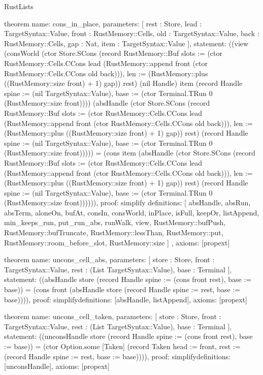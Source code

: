 \begin{lexlean}{RustLists}
\begin{semanticmodule}
theorem{
  name: cons_in_place,
  parameters: [
    rest : Store,
    lead : TargetSyntax::Value,
    front : RustMemory::Cells,
    old : TargetSyntax::Value,
    back : RustMemory::Cells,
    gap : Nat,
    item : TargetSyntax::Value
  ],
  statement: ((view (consWorld (ctor Store.SCons (record RustMemory::Buf {slots := (ctor RustMemory::Cells.CCons lead (RustMemory::append front (ctor RustMemory::Cells.CCons old back))), len := (RustMemory::plus ((RustMemory::size front) + 1) gap)}) rest) (nil Handle) item (record Handle {spine := (nil TargetSyntax::Value), base := (ctor Terminal.TRun 0 (RustMemory::size front))})) (absHandle (ctor Store.SCons (record RustMemory::Buf {slots := (ctor RustMemory::Cells.CCons lead (RustMemory::append front (ctor RustMemory::Cells.CCons old back))), len := (RustMemory::plus ((RustMemory::size front) + 1) gap)}) rest) (record Handle {spine := (nil TargetSyntax::Value), base := (ctor Terminal.TRun 0 (RustMemory::size front))}))) = (cons item (absHandle (ctor Store.SCons (record RustMemory::Buf {slots := (ctor RustMemory::Cells.CCons lead (RustMemory::append front (ctor RustMemory::Cells.CCons old back))), len := (RustMemory::plus ((RustMemory::size front) + 1) gap)}) rest) (record Handle {spine := (nil TargetSyntax::Value), base := (ctor Terminal.TRun 0 (RustMemory::size front))})))),
  proof: simplify{
    definitions: [
      absHandle,
      absRun,
      absTerm,
      aloneOn,
      bufAt,
      consIn,
      consWorld,
      inPlace,
      isFull,
      keepOr,
      listAppend,
      min_keeps_run,
      put_run_abs,
      runWalk,
      view,
      RustMemory::bufPush,
      RustMemory::bufTruncate,
      RustMemory::lessThan,
      RustMemory::put,
      RustMemory::room_before_slot,
      RustMemory::size
    ]
  },
  axioms: [propext]
}

theorem{
  name: uncons_cell_abs,
  parameters: [
    store : Store,
    front : TargetSyntax::Value,
    rest : (List TargetSyntax::Value),
    base : Terminal
  ],
  statement: ((absHandle store (record Handle {spine := (cons front rest), base := base})) = (cons front (absHandle store (record Handle {spine := rest, base := base})))),
  proof: simplify{definitions: [absHandle, listAppend]},
  axioms: [propext]
}

theorem{
  name: uncons_cell_taken,
  parameters: [
    store : Store,
    front : TargetSyntax::Value,
    rest : (List TargetSyntax::Value),
    base : Terminal
  ],
  statement: ((unconsHandle store (record Handle {spine := (cons front rest), base := base})) = (ctor Option.some [Taken] (record Taken {head := front, rest := (record Handle {spine := rest, base := base})}))),
  proof: simplify{definitions: [unconsHandle]},
  axioms: [propext]
}


\end{semanticmodule}
\end{lexlean}
